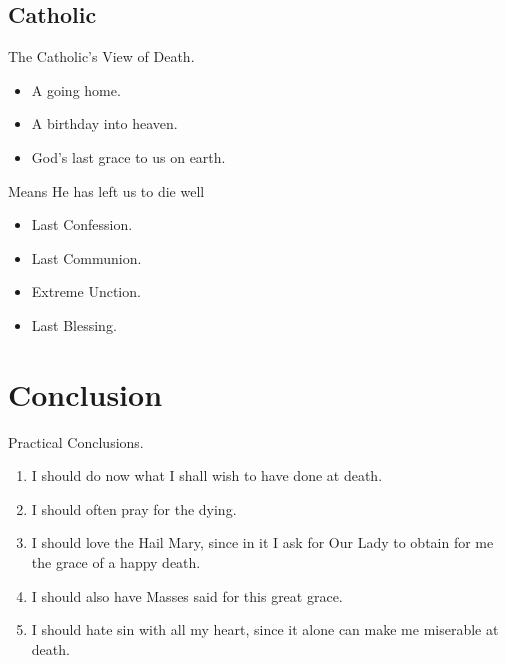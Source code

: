 \documentclass{beamer}
\begin{document}
\subsection{Catholic}

\begin{frame}{The Catholic's View of Death.}
\begin{itemize}
 \item    A going home.
 \item    A birthday into heaven.
 \item    God's last grace to us on earth.
\end{itemize}
\end{frame}

\begin{frame}{Means He has left us to die well}
\begin{itemize}
\item Last Confession.
\item Last Communion.
\item   Extreme Unction. 
\item Last Blessing.
\end{itemize}
\end{frame}

\section{Conclusion}

\begin{frame}{Practical Conclusions.}
\begin{enumerate}
\item  I should do now what I shall wish to have done at death.
\item  I should often pray for the dying.
\item  I should love the Hail Mary, since in it I ask for Our Lady  to  obtain
  for me the grace of a happy death.
\item  I should also have Masses said for this great grace.
\item  I should hate sin with all  my  heart,  since  it  alone  can  make  me
  miserable at death.
\end{enumerate}
\end{frame}
\end{document}
